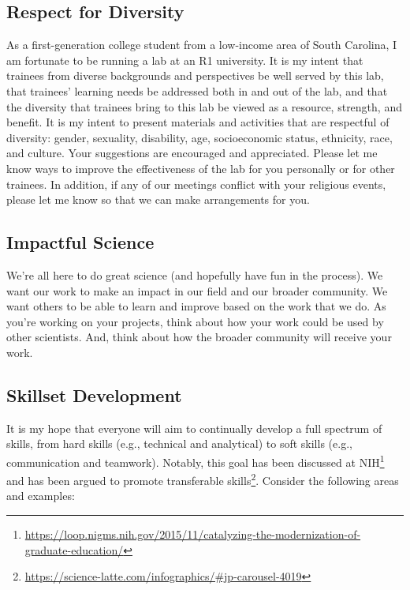 \documentclass[letterpaper,11pt,oneside]{memoir}
\begin{document}
\subsection{Respect for Diversity}
As a first-generation college student from a low-income area of South Carolina, I am fortunate to be running a lab at an R1 university. It is my intent that trainees from diverse backgrounds and perspectives be well served by this lab, that trainees’ learning needs be addressed both in and out of the lab, and that the diversity that trainees bring to this lab be viewed as a resource, strength, and benefit. It is my intent to present materials and activities that are respectful of diversity: gender, sexuality, disability, age, socioeconomic status, ethnicity, race, and culture. Your suggestions are encouraged and appreciated. Please let me know ways to improve the effectiveness of the lab for you personally or for other trainees. In addition, if any of our meetings conflict with your religious events, please let me know so that we can make arrangements for you.

\subsection{Impactful Science}
We're all here to do great science (and hopefully have fun in the process). We want our work to make an impact in our field and our broader community. We want others to be able to learn and improve based on the work that we do. As you're working on your projects, think about how your work could be used by other scientists. And, think about how the broader community will receive your work. 

\subsection{Skillset Development}
It is my hope that everyone will aim to continually develop a full spectrum of skills, from hard skills (e.g., technical and analytical) to soft skills (e.g., communication and teamwork). Notably, this goal has been discussed at NIH\footnote{\url{https://loop.nigms.nih.gov/2015/11/catalyzing-the-modernization-of-graduate-education/}} and has been argued to promote transferable skills\footnote{\url{https://science-latte.com/infographics/\#jp-carousel-4019}}. Consider the following areas and examples: 
\end{document}
